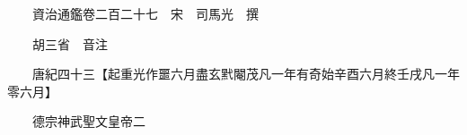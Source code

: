 










 


 
 


 

  
  
  
  
  





  
  
  
  
  
 
  

  

  
  
  



  

 
 

  
   




  

  
  


  　　資治通鑑卷二百二十七　宋　司馬光　撰

　　胡三省　音注

　　唐紀四十三【起重光作噩六月盡玄黓閹茂凡一年有奇始辛酉六月終壬戌凡一年零六月】

　　德宗神武聖文皇帝二

